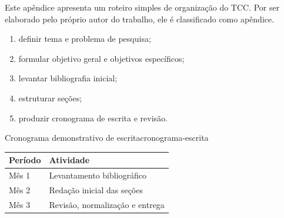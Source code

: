 %
%
%
%
%


Este apêndice apresenta um roteiro simples de organização do TCC. Por ser elaborado pelo próprio autor do trabalho, ele é classificado como apêndice.

\begin{enumerate}
	\item definir tema e problema de pesquisa;
	\item formular objetivo geral e objetivos específicos;
	\item levantar bibliografia inicial;
	\item estruturar seções;
	\item produzir cronograma de escrita e revisão.
\end{enumerate}

\begin{undftabela}{Cronograma demonstrativo de escrita}{cronograma-escrita}
	\begin{tabular}{p{} p{}}
		\hline
		\textbf{Período} & \textbf{Atividade} \\
		\hline
		Mês 1 & Levantamento bibliográfico \\
		Mês 2 & Redação inicial das seções \\
		Mês 3 & Revisão, normalização e entrega \\
		\hline
	\end{tabular}
\end{undftabela}
